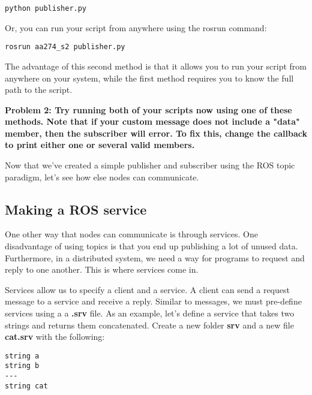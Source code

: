 \begin{tcolorbox}
\begin{lstlisting}
python publisher.py
\end{lstlisting}
\end{tcolorbox}

Or, you can run your script from anywhere using the rosrun command:

\begin{tcolorbox}
\begin{lstlisting}
rosrun aa274_s2 publisher.py
\end{lstlisting}
\end{tcolorbox}

The advantage of this second method is that it allows you to run your script from anywhere on your system, while the first method requires you to know the full path to the script.

\textbf{Problem 2: Try running both of your scripts now using one of these methods. Note that if your custom message does not include a "data" member, then the subscriber will error. To fix this, change the callback to print either one or several valid members.}

Now that we've created a simple publisher and subscriber using the ROS topic paradigm, let's see how else nodes can communicate. 
\subsection{Making a ROS service}

One other way that nodes can communicate is through services. One disadvantage of using topics is that you end up publishing a lot of unused data. Furthermore, in a distributed system, we need a way for programs to request and reply to one another. This is where services come in. 

Services allow us to specify a client and a service. A client can send a request message to a service and receive a reply. Similar to messages, we must pre-define services using a a \textbf{.srv} file. As an example, let's define a service that takes two strings and returns them concatenated. Create a new folder \textbf{srv} and a new file \textbf{cat.srv} with the following:

\begin{tcolorbox}
\begin{lstlisting}
string a
string b
---
string cat
\end{lstlisting}
\end{tcolorbox}


